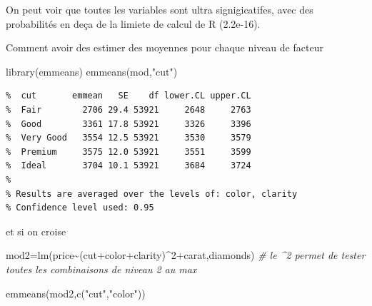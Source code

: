 \documentclass[
]{article}
\newenvironment{Shaded}{\begin{snugshade}}{\end{snugshade}}
\newcommand{\CommentTok}[1]{\textcolor[rgb]{0.56,0.35,0.01}{\textit{#1}}}
\newcommand{\DecValTok}[1]{\textcolor[rgb]{0.00,0.00,0.81}{#1}}
\newcommand{\FunctionTok}[1]{\textcolor[rgb]{0.00,0.00,0.00}{#1}}
\newcommand{\NormalTok}[1]{#1}
\newcommand{\OtherTok}[1]{\textcolor[rgb]{0.56,0.35,0.01}{#1}}
\newcommand{\SpecialCharTok}[1]{\textcolor[rgb]{0.00,0.00,0.00}{#1}}
\newcommand{\StringTok}[1]{\textcolor[rgb]{0.31,0.60,0.02}{#1}}
\begin{document}
On peut voir que toutes les variables sont ultra signigicatifes, avec
des probabilités en deça de la limiete de calcul de R (2.2e-16).

Comment avoir des estimer des moyennes pour chaque niveau de facteur

\begin{Shaded}
\begin{Highlighting}[]
\FunctionTok{library}\NormalTok{(emmeans)}
\FunctionTok{emmeans}\NormalTok{(mod,}\StringTok{"cut"}\NormalTok{)}
\end{Highlighting}
\end{Shaded}

\begin{verbatim}
%  cut       emmean   SE    df lower.CL upper.CL
%  Fair        2706 29.4 53921     2648     2763
%  Good        3361 17.8 53921     3326     3396
%  Very Good   3554 12.5 53921     3530     3579
%  Premium     3575 12.0 53921     3551     3599
%  Ideal       3704 10.1 53921     3684     3724
% 
% Results are averaged over the levels of: color, clarity 
% Confidence level used: 0.95
\end{verbatim}

et si on croise

\begin{Shaded}
\begin{Highlighting}[]
\NormalTok{mod2}\OtherTok{=}\FunctionTok{lm}\NormalTok{(price}\SpecialCharTok{\textasciitilde{}}\NormalTok{(cut}\SpecialCharTok{+}\NormalTok{color}\SpecialCharTok{+}\NormalTok{clarity)}\SpecialCharTok{\^{}}\DecValTok{2}\SpecialCharTok{+}\NormalTok{carat,diamonds) }
\CommentTok{\# le \^{}2 permet de tester toutes les combinaisons de niveau 2 au max}

\FunctionTok{emmeans}\NormalTok{(mod2,}\FunctionTok{c}\NormalTok{(}\StringTok{"cut"}\NormalTok{,}\StringTok{"color"}\NormalTok{))}
\end{Highlighting}
\end{Shaded}
\end{document}
